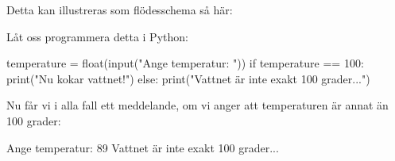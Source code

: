 Detta kan illustreras som flödesschema så här:


 Låt oss programmera detta i Python:

\begin{python}[caption={Vår första else-sats},label={}]
temperature = float(input("Ange temperatur: "))
if temperature == 100:
    print("Nu kokar vattnet!")
else:
    print("Vattnet är inte exakt 100 grader...")
\end{python}

Nu får vi i alla fall ett meddelande, om vi anger att temperaturen är annat än 100 grader:

\vspace{10pt}
\begin{python}
Ange temperatur: 89
Vattnet är inte exakt 100 grader...
\end{python}








